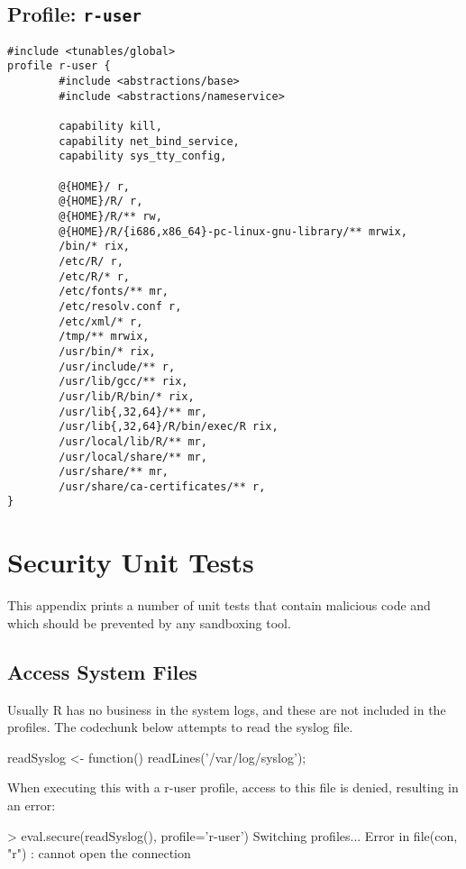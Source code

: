 \documentclass[article]{jss}
\begin{document}
\begin{appendices}
\subsection[Profile: r-user]{Profile: \texttt{r-user}}
\label{r-user}

\begin{verbatim}
#include <tunables/global>
profile r-user {
        #include <abstractions/base>
        #include <abstractions/nameservice>
	
        capability kill,
        capability net_bind_service,
        capability sys_tty_config,
	
        @{HOME}/ r,
        @{HOME}/R/ r,
        @{HOME}/R/** rw,
        @{HOME}/R/{i686,x86_64}-pc-linux-gnu-library/** mrwix,
        /bin/* rix,
        /etc/R/ r,
        /etc/R/* r,
        /etc/fonts/** mr,
        /etc/resolv.conf r,
        /etc/xml/* r,
        /tmp/** mrwix,
        /usr/bin/* rix,
        /usr/include/** r,       
        /usr/lib/gcc/** rix,		
        /usr/lib/R/bin/* rix,
        /usr/lib{,32,64}/** mr,
        /usr/lib{,32,64}/R/bin/exec/R rix,
        /usr/local/lib/R/** mr,
        /usr/local/share/** mr,
        /usr/share/** mr,
        /usr/share/ca-certificates/** r,
}
\end{verbatim}



\section{Security Unit Tests}

This appendix prints a number of unit tests that contain malicious code and
which should be prevented by any sandboxing tool.

\subsection{Access System Files}

Usually R has no business in the system logs, and these are not included in the
profiles. The codechunk below attempts to read the syslog file.
\begin{CodeChunk}
\begin{CodeInput}
readSyslog <- function(){
	readLines('/var/log/syslog');
}
\end{CodeInput}
\end{CodeChunk}
When executing this with a r-user profile, access to this file is denied,
resulting in an error:
\begin{CodeChunk}
\begin{CodeInput}
> eval.secure(readSyslog(), profile='r-user')
Switching profiles...
Error in file(con, "r") : cannot open the connection
\end{CodeInput}
\end{CodeChunk}


\end{appendices}
\end{document}
